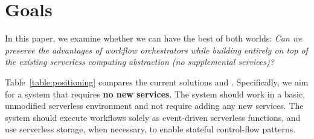 

\section{Goals}\label{sec:goals}
In this paper, we examine whether we can have the best of both worlds:
\emph{Can we preserve the advantages of workflow orchestrators while building
entirely on top of the existing serverless computing abstraction (no
supplemental services)?}

Table~\ref{table:positioning} compares the current solutions and \name{}.
Specifically, we aim for a system that requires \textbf{no new services}. The
system should work in a basic, unmodified serverless environment and not require
adding any new services.  The system should execute workflows solely as
event-driven serverless functions, and use serverless storage, when necessary,
to enable stateful control-flow patterns.

